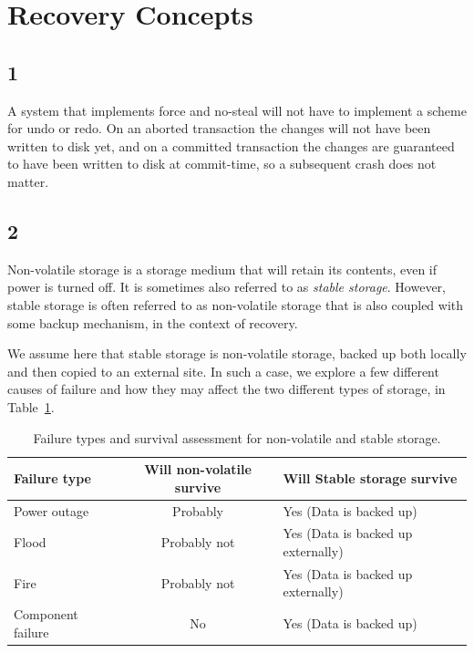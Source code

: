 \section{Recovery Concepts}
\subsection*{1}
A system that implements force and no-steal will not have to implement a scheme
for undo or redo. On an aborted transaction the changes will not have been written to
disk yet, and on a committed transaction the changes are guaranteed to have been
written to disk at commit-time, so a subsequent crash does not matter.

\subsection*{2}
Non-volatile storage is a storage medium that will retain its contents, even if
power is turned off. It is sometimes also referred to as \textit{stable storage}.
However, stable storage is often referred to as non-volatile storage that is
also coupled with some backup mechanism, in the context of recovery.

We assume here that stable storage is non-volatile storage, backed up both
locally and then copied to an external site. In such a case, we explore a few
different causes of failure and how they may affect the two different types of
storage, in Table~\ref{tbl:storage_types}.

\begin{table}[h!]
    \begin{tabular}{|l|c|l|}
        \hline
        \textbf{Failure type} & \textbf{Will non-volatile survive} &
        \textbf{Will Stable storage survive}
        \\ \hline
        Power outage & Probably & Yes (Data is backed up) \\ \hline
        Flood & Probably not & Yes (Data is backed up externally) \\ \hline
        Fire & Probably not & Yes (Data is backed up externally) \\ \hline
        Component failure & No & Yes (Data is backed up) \\ \hline
    \end{tabular}
    \caption{Failure types and survival assessment for non-volatile and stable
        storage.\label{tbl:storage_types}}
\end{table}


